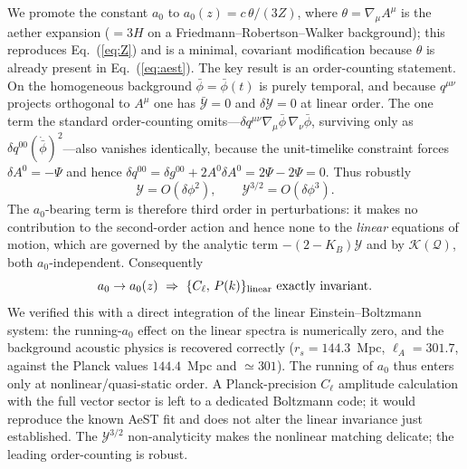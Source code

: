 \documentclass[aps,prd,preprint,nofootinbib,floatfix]{revtex4-2}
\begin{document}
We promote the constant $a_0$ to $a_0(z)=c\,\theta/(3Z)$, where
$\theta=\nabla_\mu A^\mu$ is the aether expansion ($=3H$ on a
Friedmann--Robertson--Walker background); this reproduces Eq.~(\ref{eq:Z}) and is
a minimal, covariant modification because $\theta$ is already present in
Eq.~(\ref{eq:aest}). The key result is an order-counting statement. On the
homogeneous background $\bar\phi=\bar\phi(t)$ is purely temporal, and because
$q^{\mu\nu}$ projects orthogonal to $A^\mu$ one has $\bar{\mathcal{Y}}=0$ and
$\delta\mathcal{Y}=0$ at linear order. The one term the standard order-counting
omits---$\delta q^{\mu\nu}\nabla_\mu\bar\phi\,\nabla_\nu\bar\phi$, surviving only as
$\delta q^{00}(\dot{\bar\phi})^2$---also vanishes identically, because the
unit-timelike constraint forces $\delta A^0=-\Psi$ and hence
$\delta q^{00}=\delta g^{00}+2A^0\delta A^0=2\Psi-2\Psi=0$. Thus robustly
\begin{equation}
\mathcal{Y}=O(\delta\phi^2),\qquad
\mathcal{Y}^{3/2}=O(\delta\phi^3).
\end{equation}
The $a_0$-bearing term is therefore third order in perturbations: it makes no
contribution to the second-order action and hence none to the {\it linear}
equations of motion, which are governed by the analytic term
$-(2-K_B)\mathcal{Y}$ and by $\mathcal{K}(\mathcal{Q})$, both $a_0$-independent.
Consequently
\begin{equation}
a_0\to a_0(z)\ \Rightarrow\ \{C_\ell,\,P(k)\}_{\rm linear}\ \text{exactly invariant.}
\end{equation}
We verified this with a direct integration of the linear Einstein--Boltzmann
system: the running-$a_0$ effect on the linear spectra is numerically zero, and
the background acoustic physics is recovered correctly ($r_s=144.3$~Mpc,
$\ell_A=301.7$, against the Planck values $144.4$~Mpc and $\simeq301$). The
running of $a_0$ thus enters only at nonlinear/quasi-static order. A
Planck-precision $C_\ell$ amplitude calculation with the full vector sector is
left to a dedicated Boltzmann code; it would reproduce the known AeST fit and does
not alter the linear invariance just established. The $\mathcal{Y}^{3/2}$
non-analyticity makes the nonlinear matching delicate; the leading order-counting
is robust.

\end{document}
